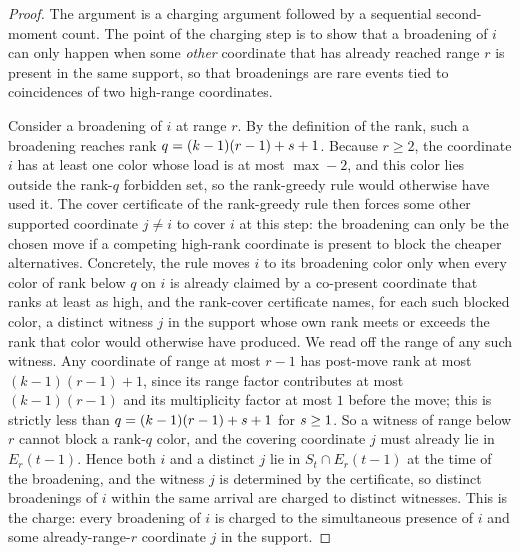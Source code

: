\begin{proof}
The argument is a charging argument followed by a sequential second-moment count. The point of the charging step is to show
that a broadening of $i$ can only happen when some \emph{other} coordinate that has already reached range $r$ is present in
the same support, so that broadenings are rare events tied to coincidences of two high-range coordinates.

Consider a broadening of $i$ at range $r$. By the definition of the rank, such a broadening reaches rank
$q=(k-1)(r-1)+s+1$. Because $r\ge2$, the coordinate $i$ has at least one color whose load is at most $\max-2$, and
this color lies outside the rank-$q$ forbidden set, so the rank-greedy rule would otherwise have used it. The cover
certificate of the rank-greedy rule then forces some other supported coordinate $j\ne i$ to cover $i$ at this step: the
broadening can only be the chosen move if a competing high-rank coordinate is present to block the cheaper alternatives.
Concretely, the rule moves $i$ to its broadening color only when every color of rank below $q$ on $i$ is already claimed by a
co-present coordinate that ranks at least as high, and the rank-cover certificate names, for each such blocked color, a
distinct witness $j$ in the support whose own rank meets or exceeds the rank that color would otherwise have produced. We read
off the range of any such witness. Any coordinate of range at most $r-1$ has post-move rank at most
$(k-1)(r-1)+1$, since its range factor contributes at most $(k-1)(r-1)$ and its multiplicity factor at most $1$ before the
move; this is strictly less than $q=(k-1)(r-1)+s+1$ for $s\ge1$. So a witness of range below $r$ cannot block a
rank-$q$ color, and the covering coordinate $j$ must already lie in $E_r(t-1)$. Hence both $i$ and a distinct $j$ lie in
$S_t\cap E_r(t-1)$ at the time of the broadening, and the witness $j$ is determined by the certificate, so distinct
broadenings of $i$ within the same arrival are charged to distinct witnesses. This is the charge: every broadening of $i$ is
charged to the simultaneous presence of $i$ and some already-range-$r$ coordinate $j$ in the support.


\end{proof}
